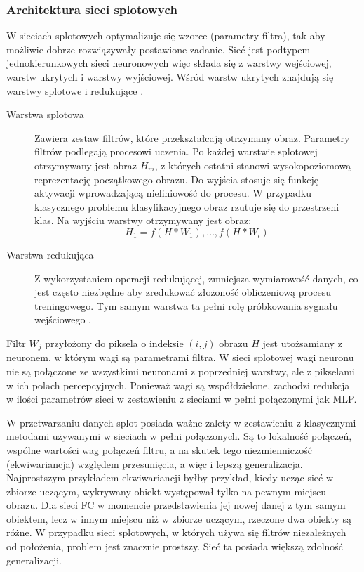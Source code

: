 \subsubsection{Architektura sieci splotowych}
W sieciach splotowych optymalizuje się wzorce (parametry filtra), tak aby możliwie dobrze rozwiązywały postawione zadanie. Sieć jest podtypem jednokierunkowych sieci neuronowych więc składa się z warstwy wejściowej, warstw ukrytych i warstwy wyjściowej. Wśród warstw ukrytych znajdują się warstwy splotowe  i redukujące .
\par

\begin{description}
    \item[Warstwa splotowa]  
    Zawiera zestaw filtrów, które przekształcają otrzymany obraz. Parametry filtrów podlegają procesowi uczenia. Po każdej warstwie splotowej otrzymywany jest obraz $H_m$, z których ostatni stanowi wysokopoziomową reprezentację początkowego obrazu. Do wyjścia stosuje się funkcję aktywacji wprowadzającą nieliniowość do procesu. W przypadku klasycznego problemu klasyfikacyjnego obraz rzutuje się do przestrzeni klas. Na wyjściu warstwy otrzymywany jest obraz\cite{matematyk2022-fh}:
    \[H_1=f(H*W_1), \dots, f(H*W_l)\]
    \item[Warstwa redukująca]
    Z wykorzystaniem operacji redukującej, zmniejsza wymiarowość danych, co jest często niezbędne aby zredukować złożoność obliczeniową procesu treningowego. Tym samym warstwa ta pełni rolę próbkowania sygnału wejściowego .
\end{description}
\par 

Filtr $W_j$ przyłożony do piksela o indeksie $(i,j)$ obrazu $H$ jest utożsamiany z neuronem, w którym wagi są parametrami filtra. W sieci splotowej wagi neuronu nie są połączone ze wszystkimi neuronami z poprzedniej warstwy, ale z pikselami w ich polach percepcyjnych. Ponieważ wagi są współdzielone, zachodzi redukcja w ilości parametrów sieci w zestawieniu z sieciami w pełni połączonymi jak MLP.
\par
W przetwarzaniu danych splot posiada ważne zalety w zestawieniu z klasycznymi metodami używanymi w sieciach w pełni połączonych. Są to lokalność połączeń, wspólne wartości wag połączeń filtru, a na skutek tego niezmienniczość (ekwiwariancja) względem przesunięcia\cite{osowski2018glkebokie}, a więc i lepszą generalizacja. Najprostszym przykładem ekwiwariancji byłby przykład, kiedy ucząc sieć w zbiorze uczącym, wykrywany obiekt występował tylko na pewnym miejscu obrazu. Dla sieci FC w momencie przedstawienia jej nowej danej z tym samym obiektem, lecz w innym miejscu niż w zbiorze uczącym, rzeczone dwa obiekty są różne. W przypadku sieci splotowych, w których używa się filtrów niezależnych od położenia, problem jest znacznie prostszy. Sieć ta posiada większą zdolność generalizacji.


